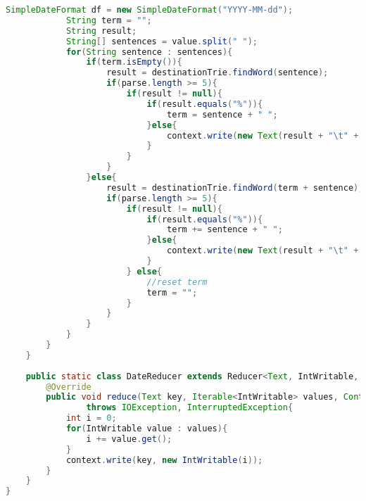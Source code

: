 \begin{lstlisting}[language=Java,basicstyle=\tiny,caption=Counter.java (MapReduce)]
            SimpleDateFormat df = new SimpleDateFormat("YYYY-MM-dd");
            String term = "";
            String result;
            String[] sentences = value.split(" ");
            for(String sentence : sentences){
                if(term.isEmpty()){
                    result = destinationTrie.findWord(sentence);
                    if(parse.length >= 5){
                        if(result != null){
                            if(result.equals("%")){
                                term = sentence + " ";
                            }else{
                                context.write(new Text(result + "\t" + df.format(new Date(Long.parseLong(parse[parse.length - 1])))), new IntWritable(1));
                            }
                        }
                    }
                }else{
                    result = destinationTrie.findWord(term + sentence);
                    if(parse.length >= 5){
                        if(result != null){
                            if(result.equals("%")){
                                term += sentence + " ";
                            }else{
                                context.write(new Text(result + "\t" + df.format(new Date(Long.parseLong(parse[parse.length - 1])))), new IntWritable(1));
                            }
                        } else{
                            //reset term
                            term = "";
                        }
                    }
                }
            }
        }
    }
    
    public static class DateReducer extends Reducer<Text, IntWritable, Text, IntWritable>{        
        @Override
        public void reduce(Text key, Iterable<IntWritable> values, Context context) 
                throws IOException, InterruptedException{
            int i = 0;
            for(IntWritable value : values){
                i += value.get();
            }            
            context.write(key, new IntWritable(i));
        }
    }
}
\end{lstlisting}